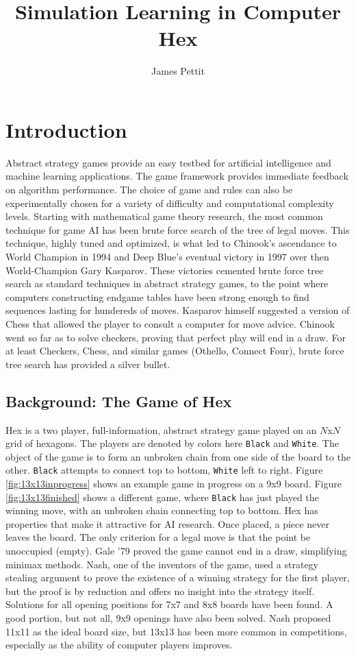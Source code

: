 \documentclass[10pt,a4paper]{report}
\author{James Pettit}
\title{Simulation Learning in Computer Hex}
\newcommand{\black}{\texttt{Black}}
\newcommand{\white}{\texttt{White}}
\begin{document}
\maketitle
\tableofcontents

\chapter{Introduction}
Abstract strategy games provide an easy testbed for artificial intelligence and machine learning applications. The game framework provides immediate feedback on algorithm performance. The choice of game and rules can also be experimentally chosen for a variety of difficulty and computational complexity levels. Starting with mathematical game theory research, the most common technique for game AI has been brute force search of the tree of legal moves. This technique, highly tuned and optimized, is what led to Chinook's ascendance to World Champion in 1994 and Deep Blue's eventual victory in 1997 over then World-Champion Gary Kasparov. These victories cemented brute force tree search as standard techniques in abstract strategy games, to the point where computers constructing endgame tables have been strong enough to find sequences lasting for hundereds of moves. Kasparov himself suggested a version of Chess that allowed the player to consult a computer for move advice. Chinook went so far as to solve checkers, proving that perfect play will end in a draw. For at least Checkers, Chess, and similar games (Othello, Connect Four), brute force tree search has provided a silver bullet.

\section{Background: The Game of Hex}
Hex is a two player, full-information, abstract strategy game played on an $N$x$N$ grid of hexagons. The players are denoted by colors here \black{} and \white. The object of the game is to form an unbroken chain from one side of the board to the other. \black{} attempts to connect top to bottom, \white{} left to right. Figure \ref{fig:13x13inprogress} shows an example game in progress on a 9x9 board. Figure \ref{fig:13x13finished} shows a different game, where \black{} has just played the winning move, with an unbroken chain connecting top to bottom. Hex has properties that make it attractive for AI research. Once placed, a piece never leaves the board. The only criterion for a legal move is that the point be unoccupied (empty). Gale '79 proved the game cannot end in a draw, simplifying minimax methods. Nash, one of the inventors of the game, used a strategy stealing argument to prove the existence of a winning strategy for the first player, but the proof is by reduction and offers no insight into the strategy itself. Solutions for all opening positions for 7x7 and 8x8 boards have been found\cite{henderson2009solving}. A good portion, but not all, 9x9 openings have also been solved. Nash proposed 11x11 as the ideal board size, but 13x13 has been more common in competitions, especially as the ability of computer players improves.
\end{document}
